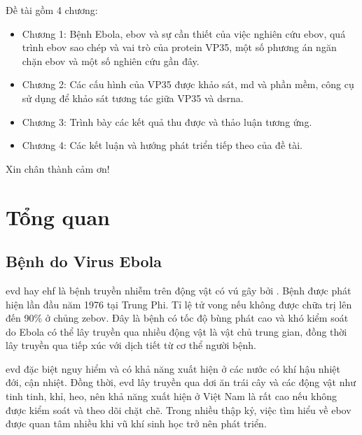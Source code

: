 \documentclass[12pt,a4paper,reqno, oneside]{book}
\begin{document}
	Đề tài gồm 4 chương:
	\begin{itemize}
	\item Chương 1: Bệnh Ebola, \gls{ebov} và sự cần thiết của việc nghiên cứu \gls{ebov}, quá trình \gls{ebov} sao chép và vai trò của protein VP35, một số phương án ngăn chặn \gls{ebov} và một số nghiên cứu gần đây.
	\item Chương 2: Các cấu hình của VP35 được khảo sát, \gls{md} và phần mềm, công cụ sử dụng để khảo sát tương tác giữa VP35 và \gls{dsrna}.
	\item Chương 3: Trình bày các kết quả thu được và thảo luận tương ứng.
	\item Chương 4: Các kết luận và hướng phát triển tiếp theo của đề tài.
	\end{itemize}

	\textrm{Xin chân thành cảm ơn!}
 
 
 
 
\newpage
\pagestyle{fancy}
\setcounter{page}{1}
\setcounter{chapter}{0}
\chapter{Tổng quan}

\section{Bệnh do Virus Ebola}

	\gls{evd} hay \gls{ehf} là bệnh truyền nhiễm trên động vật có vú gây bởi . Bệnh được phát hiện lần đầu năm 1976 tại Trung Phi\cite{Feldmann2003}. Tỉ lệ tử vong nếu không được chữa trị lên đến 90\% ở chủng \gls{zebov}. Đây là bệnh có tốc độ bùng phát cao và khó kiểm soát do Ebola có thể lây truyền qua nhiều động vật là vật chủ trung gian, đồng thời lây truyền qua tiếp xúc với dịch tiết từ cơ thể người bệnh\cite{Colebunders2000}.
	
	\gls{evd} đặc biệt nguy hiểm và có khả năng xuất hiện ở các nước có khí hậu nhiệt đới, cận nhiệt\cite{Ansari2014}. Đồng thời, \gls{evd} lây truyền qua dơi ăn trái cây và các động vật như tinh tinh, khỉ, heo\cite{Kuhn2010}, nên khả năng xuất hiện ở Việt Nam là rất cao nếu không được kiểm soát và theo dõi chặt chẽ. Trong nhiều thập kỷ, việc tìm hiểu về \gls{ebov} được quan tâm nhiều khi vũ khí sinh học trở nên phát triển\cite{Feldmann2003, Lee2009}.
	
\end{document}
